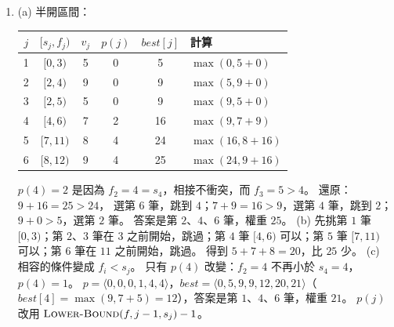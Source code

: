 \begin{enumerate}
\item (a) 半開區間：
\begin{center}
\begin{tabular}{cccccl}
\toprule
$j$ & $[s_j, f_j)$ & $v_j$ & $p(j)$ & $\mathit{best}[j]$ & 計算 \\
\midrule
1 & $[0, 3)$ & 5 & 0 & 5 & $\max(0, 5 + 0)$ \\
2 & $[2, 4)$ & 9 & 0 & 9 & $\max(5, 9 + 0)$ \\
3 & $[2, 5)$ & 5 & 0 & 9 & $\max(9, 5 + 0)$ \\
4 & $[4, 6)$ & 7 & 2 & 16 & $\max(9, 7 + 9)$ \\
5 & $[7, 11)$ & 8 & 4 & 24 & $\max(16, 8 + 16)$ \\
6 & $[8, 12)$ & 9 & 4 & 25 & $\max(24, 9 + 16)$ \\
\bottomrule
\end{tabular}
\end{center}
$p(4) = 2$ 是因為 $f_2 = 4 = s_4$，相接不衝突，而 $f_3 = 5 > 4$。 還原：$9 + 16 = 25 > 24$，
選第 $6$ 筆，跳到 $4$；$7 + 9 = 16 > 9$，選第 $4$ 筆，跳到 $2$；$9 + 0 > 5$，選第 $2$ 筆。
答案是第 $2$、$4$、$6$ 筆，權重 $25$。
(b) 先挑第 $1$ 筆 $[0, 3)$；第 $2$、$3$ 筆在 $3$ 之前開始，跳過；第 $4$ 筆 $[4, 6)$ 可以；第
$5$ 筆 $[7, 11)$ 可以；第 $6$ 筆在 $11$ 之前開始，跳過。 得到 $5 + 7 + 8 = 20$，比 $25$ 少。
(c) 相容的條件變成 $f_i < s_j$。 只有 $p(4)$ 改變：$f_2 = 4$ 不再小於 $s_4 = 4$，
$p(4) = 1$。 $p = \langle 0, 0, 0, 1, 4, 4 \rangle$，$\mathit{best} = \langle 0, 5, 9, 9, 12,
20, 21 \rangle$（$\mathit{best}[4] = \max(9, 7 + 5) = 12$），答案是第 $1$、$4$、$6$ 筆，權重
$21$。 $p(j)$ 改用 $\proc{Lower-Bound}(f, j - 1, s_j) - 1$。


\end{enumerate}
